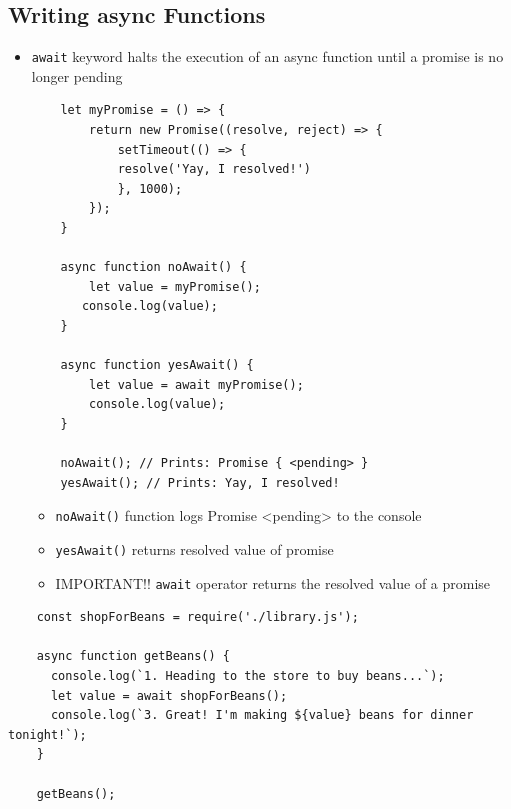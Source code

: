 \documentclass[12pt]{article}
\begin{document}
\subsection{Writing async Functions}
\begin{itemize}
    \item \texttt{await} keyword halts the execution of an async function until a promise is no longer pending

    \begin{lstlisting}
    let myPromise = () => {
        return new Promise((resolve, reject) => {
            setTimeout(() => {
            resolve('Yay, I resolved!')
            }, 1000);
        });
    }

    async function noAwait() {
        let value = myPromise();
       console.log(value);
    }

    async function yesAwait() {
        let value = await myPromise();
        console.log(value);
    }

    noAwait(); // Prints: Promise { <pending> }
    yesAwait(); // Prints: Yay, I resolved!
    \end{lstlisting}

    \begin{itemize}
        \item \texttt{noAwait()} function logs Promise { <pending> } to the console
        \item \texttt{yesAwait()} returns resolved value of promise
        \item IMPORTANT!! \texttt{await} operator returns the resolved value of a promise
    \end{itemize}
\end{itemize}

\begin{lstlisting}
    const shopForBeans = require('./library.js');

    async function getBeans() {
      console.log(`1. Heading to the store to buy beans...`);
      let value = await shopForBeans();
      console.log(`3. Great! I'm making ${value} beans for dinner tonight!`);
    }

    getBeans();
\end{lstlisting}
\end{document}
